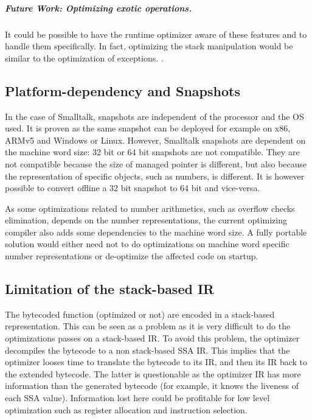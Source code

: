 \documentclass[a4paper,12pt,twoside]{../includes/ThesisStyle}
\begin{document}
\subparagraph{Future Work: Optimizing exotic operations.} It could be possible to have the runtime optimizer aware of these features and to handle them specifically. 
In fact, optimizing the stack manipulation would be similar to the optimization of exceptions.  \cite{Ogas01a}.  %

\subsection{Platform-dependency and Snapshots}
In the case of Smalltalk, snapshots are independent of the processor and the OS used. It is proven as the same snapshot can be deployed for example on x86, ARMv5 and Windows or Linux. However, Smalltalk snapshots are dependent on the machine word size: 32 bit or 64 bit snapshots are not compatible. They are not compatible because the size of managed pointer is different, but also because the representation of specific objects, such as numbers, is different. It is however possible to convert offline a 32 bit snapshot to 64 bit and vice-versa. 

As some optimizations related to number arithmetics, such as overflow checks elimination, depends on the number representations, the current optimizing compiler also adds some dependencies to the machine word size. A fully portable solution would either need not to do optimizations on machine word specific number representations or de-optimize the affected code on startup.

\subsection{Limitation of the stack-based IR}

The bytecoded function (optimized or not) are encoded in a stack-based representation. This can be seen as a problem as it is very difficult to do the optimizations passes on a stack-based IR. To avoid this problem, the optimizer decompiles the bytecode to a non stack-based SSA IR. This implies that the optimizer looses time to translate the bytecode to its IR, and then its IR back to the extended bytecode. The latter is questionable as the optimizer IR has more information than the generated bytecode (for example, it knows the liveness of each SSA value). Information lost here could be profitable for low level optimization such as register allocation and instruction selection.
\end{document}
